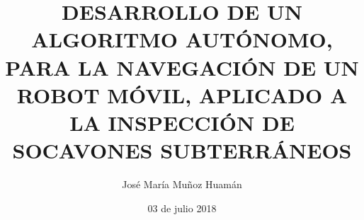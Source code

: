 \documentclass[a4paper, 12pt, oneside]{JMtesis}
\begin{document}
\frontmatter
{}
\title {DESARROLLO DE UN ALGORITMO AUT\'ONOMO, PARA LA NAVEGACI\'ON DE UN ROBOT M\'OVIL, APLICADO A LA INSPECCI\'ON DE SOCAVONES SUBTERR\'ANEOS}
\author{Jos\'e Mar\'ia Muñoz Huam\'an}
\date{03 de julio 2018}

\maketitle
{}

%
%
%

\tableofcontents


\mainmatter
\pagestyle{fancy}

%





%

% 


\renewcommand{\bibname}{\large\bf{REFERENCIAS BIBLIOGR\'AFICAS}}
\end{document}
